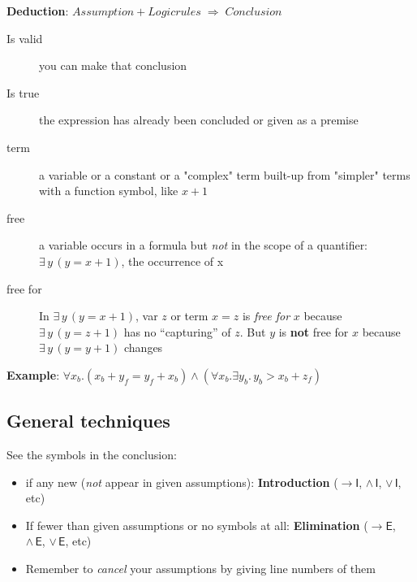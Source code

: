 \textbf{Deduction}: \(Assumption + Logic rules\; \Rightarrow\; Conclusion\)
\begin{description}
\item[Is valid] you can make that conclusion
\item[Is true] the expression has already been concluded or given as a premise
\item[term] a variable or a constant or a "complex" term built-up from "simpler" terms with a function symbol, like $x+1$
\item[free] a variable occurs in a formula but \emph{not} in the scope of a quantifier: $\exists\,y\,(y=x+1)$, the occurrence of x
\item[free for] In $\exists\,y\,(y=x+1)$, var $z$ or term $x=z$ is \emph{free for} $x$ because $\exists\,y\,(y=z+1)$ has no ``capturing'' of $z$. But $y$ is \textbf{not} free for $x$ because $\exists\,y\,(y=y+1)$ changes
\end{description}

\textbf{Example}: $\forall x_{b}.( x_{b} + y_{f} = y_{f} + x_{b}) \land (\forall x_{b}. \exists y_{b} .\, y_{b} > x_{b} + z_{f})$

\subsection*{General techniques}
See the symbols in the conclusion:
\begin{itemize}
\item if any new (\emph{not} appear in given assumptions): \textbf{Introduction} ($\mathsf{\rightarrow I}$, $\mathsf{\land\,I}$, $\mathsf{\lor\,I}$, etc)
\item If fewer than given assumptions or no symbols at all: \textbf{Elimination} ($\mathsf{\rightarrow E}$, $\mathsf{\land\,E}$, $\mathsf{\lor\,E}$, etc)
\item Remember to \emph{cancel} your assumptions by giving line numbers of them
\end{itemize}

